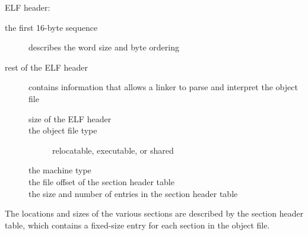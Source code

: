 \documentclass[11pt]{article}
\begin{document}
ELF header:\\
\begin{description}
\item[{the first 16-byte sequence}] describes the word size and byte ordering\\
\item[{rest of the ELF header}] contains information that allows a linker to parse and interpret the object file\\
\begin{description}
\item[{size of the ELF header}] 

\item[{the object file type}] relocatable, executable, or shared\\
\item[{the machine type}] 

\item[{the file offset of the section header table}] 

\item[{the size and number of entries in the section header table}] 
\end{description}
\end{description}

The locations and sizes of the various sections are described by the section header table, which contains a fixed-size entry for each section in the object file.\\
\end{document}
